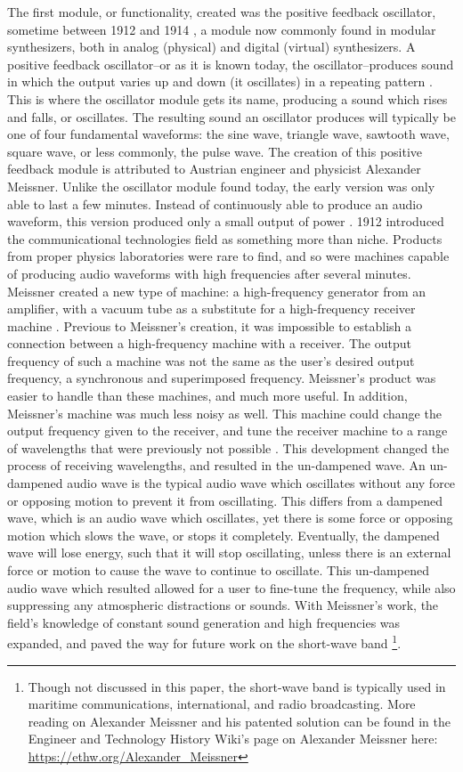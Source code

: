 The first module, or functionality, created was the positive feedback oscillator, sometime between 1912 and 1914 \cite{Gabrielli_2020}, a module now commonly found in modular synthesizers, both in analog (physical) and digital (virtual) synthesizers. A positive feedback oscillator--or as it is known today, the oscillator--produces sound in which the output varies up and down (it oscillates) in a repeating pattern \cite{Meyer_2016}.  This is where the oscillator module gets its name, producing a sound which rises and falls, or oscillates. The resulting sound an oscillator produces will typically be one of four fundamental waveforms: the sine wave, triangle wave, sawtooth wave, square wave, or less commonly, the pulse wave. The creation of this positive feedback module is attributed to Austrian engineer and physicist Alexander Meissner. Unlike the oscillator module found today, the early version was only able to last a few minutes. Instead of continuously able to produce an audio waveform, this version produced only a small output of power \cite{Fleming_1919}. 1912 introduced the communicational technologies field as something more than niche. Products from proper physics laboratories were rare to find, and so were machines capable of producing audio waveforms with high frequencies after several minutes. Meissner created a new type of machine: a high-frequency generator from an amplifier, with a vacuum tube as a substitute for a high-frequency receiver machine \cite{Fleming_1919}. Previous to Meissner's creation, it was impossible to establish a connection between a high-frequency machine with a receiver. The output frequency of such a machine was not the same as the user's desired output frequency, a synchronous and superimposed frequency. Meissner's product was easier to handle than these machines, and much more useful. In addition, Meissner's machine was much less noisy as well. This machine could change the output frequency given to the receiver, and tune the receiver machine to a range of wavelengths that were previously not possible \cite{Fleming_1919}. This development changed the process of receiving wavelengths, and resulted in the un-dampened wave. An un-dampened audio wave is the typical audio wave which oscillates without any force or opposing motion to prevent it from oscillating. This differs from a dampened wave, which is an audio wave which oscillates, yet there is some force or opposing motion which slows the wave, or stops it completely. Eventually, the dampened wave will lose energy, such that it will stop oscillating, unless there is an external force or motion to cause the wave to continue to oscillate. This un-dampened audio wave which resulted allowed for a user to fine-tune the frequency, while also suppressing any atmospheric distractions or sounds. With Meissner's work, the field's knowledge of constant sound generation and high frequencies was expanded, and paved the way for future work on the short-wave band \footnote{Though not discussed in this paper, the short-wave band is typically used in maritime communications, international, and radio broadcasting. More reading on Alexander Meissner and his patented solution can be found in the Engineer and Technology History Wiki's page on Alexander Meissner here: \url{https://ethw.org/Alexander_Meissner}}.

